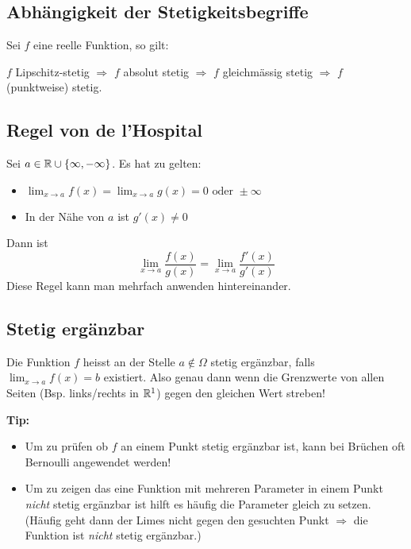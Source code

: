 \subsection{Abhängigkeit der Stetigkeitsbegriffe}
Sei $f$ eine reelle Funktion, so gilt:

$f$ Lipschitz-stetig $\Rightarrow$ $f$ absolut stetig $\Rightarrow$ $f$
gleichmässig stetig $\Rightarrow$ $f$ (punktweise) stetig.

\subsection{Regel von de l'Hospital}
Sei $a \in \mathbb{R} \cup \{\infty, -\infty\}$. Es hat zu gelten:
\begin{itemize}
  \item $\lim_{x \to a} f(x) = \lim_{x \to a} g(x) = 0 \text{ oder } \pm\infty$
  \item In der Nähe von $a$ ist $g'(x) \neq 0$
\end{itemize}
Dann ist
\[
\lim_{x \to a} \frac{f(x)}{g(x)} = \lim_{x \to a}
\frac{f'(x)}{g'(x)}
\]
Diese Regel kann man mehrfach anwenden hintereinander.


\subsection{Stetig ergänzbar}
Die Funktion $f$ heisst an der Stelle $a \notin \Omega$ stetig ergänzbar, falls $\lim_{x \to a} f(x) = b$ existiert. Also genau dann wenn die Grenzwerte von allen Seiten (Bsp. links/rechts in $\mathbb{R}^1$) gegen den gleichen Wert streben! 

\textbf{Tip:}
\begin{itemize}
	\item Um zu prüfen ob $f$ an einem Punkt stetig ergänzbar ist, kann bei Brüchen oft Bernoulli angewendet werden!
  	\item Um zu zeigen das eine Funktion mit mehreren Parameter in einem Punkt \emph{nicht} stetig ergänzbar ist
	hilft es häufig die Parameter gleich zu setzen. (Häufig geht dann der Limes nicht gegen den gesuchten Punkt
	 $\Rightarrow$ die Funktion ist \emph{nicht} stetig ergänzbar.)
\end{itemize}
